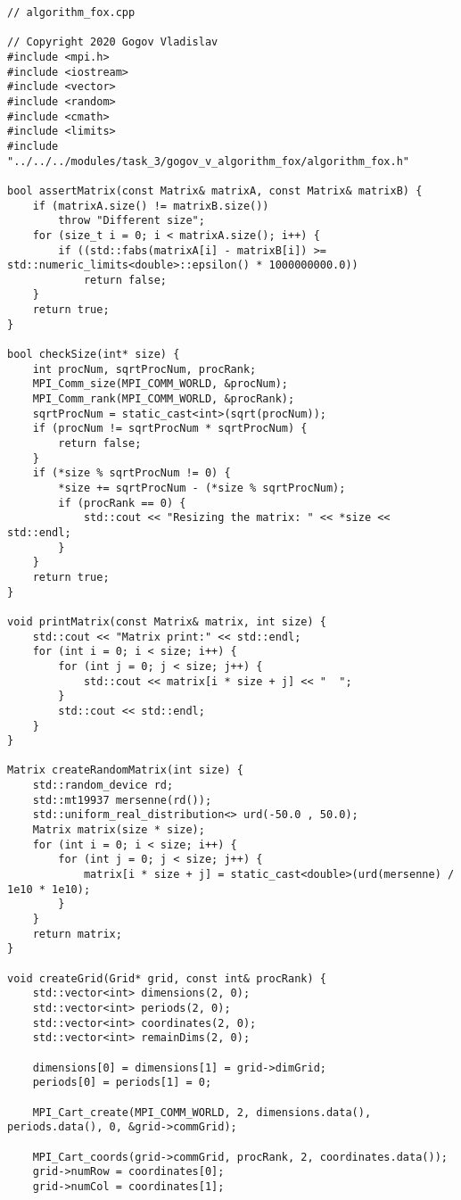 \documentclass{report}
\begin{document}
\begin{lstlisting}
// algorithm_fox.cpp

// Copyright 2020 Gogov Vladislav
#include <mpi.h>
#include <iostream>
#include <vector>
#include <random>
#include <cmath>
#include <limits>
#include "../../../modules/task_3/gogov_v_algorithm_fox/algorithm_fox.h"

bool assertMatrix(const Matrix& matrixA, const Matrix& matrixB) {
    if (matrixA.size() != matrixB.size())
        throw "Different size";
    for (size_t i = 0; i < matrixA.size(); i++) {
        if ((std::fabs(matrixA[i] - matrixB[i]) >= std::numeric_limits<double>::epsilon() * 1000000000.0))
            return false;
    }
    return true;
}

bool checkSize(int* size) {
    int procNum, sqrtProcNum, procRank;
    MPI_Comm_size(MPI_COMM_WORLD, &procNum);
    MPI_Comm_rank(MPI_COMM_WORLD, &procRank);
    sqrtProcNum = static_cast<int>(sqrt(procNum));
    if (procNum != sqrtProcNum * sqrtProcNum) {
        return false;
    }
    if (*size % sqrtProcNum != 0) {
        *size += sqrtProcNum - (*size % sqrtProcNum);
        if (procRank == 0) {
            std::cout << "Resizing the matrix: " << *size << std::endl;
        }
    }
    return true;
}

void printMatrix(const Matrix& matrix, int size) {
    std::cout << "Matrix print:" << std::endl;
    for (int i = 0; i < size; i++) {
        for (int j = 0; j < size; j++) {
            std::cout << matrix[i * size + j] << "  ";
        }
        std::cout << std::endl;
    }
}

Matrix createRandomMatrix(int size) {
    std::random_device rd;
    std::mt19937 mersenne(rd());
    std::uniform_real_distribution<> urd(-50.0 , 50.0);
    Matrix matrix(size * size);
    for (int i = 0; i < size; i++) {
        for (int j = 0; j < size; j++) {
            matrix[i * size + j] = static_cast<double>(urd(mersenne) / 1e10 * 1e10);
        }
    }
    return matrix;
}

void createGrid(Grid* grid, const int& procRank) {
    std::vector<int> dimensions(2, 0);
    std::vector<int> periods(2, 0);
    std::vector<int> coordinates(2, 0);
    std::vector<int> remainDims(2, 0);

    dimensions[0] = dimensions[1] = grid->dimGrid;
    periods[0] = periods[1] = 0;

    MPI_Cart_create(MPI_COMM_WORLD, 2, dimensions.data(), periods.data(), 0, &grid->commGrid);

    MPI_Cart_coords(grid->commGrid, procRank, 2, coordinates.data());
    grid->numRow = coordinates[0];
    grid->numCol = coordinates[1];


\end{lstlisting}
\end{document}
